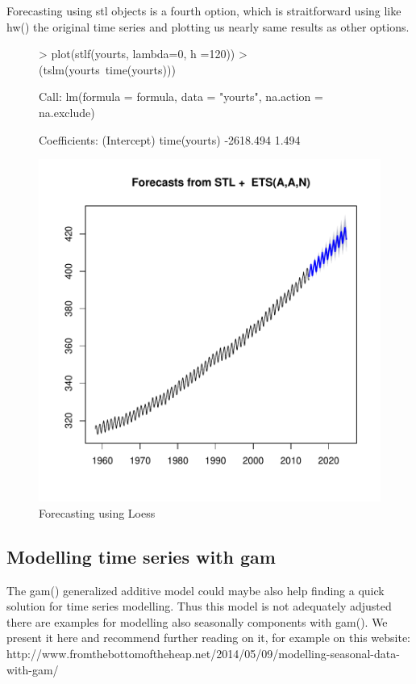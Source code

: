 \documentclass[10pt, a4paper]{article} %
\begin{document}
Forecasting using stl objects is a fourth option, which is straitforward using like hw() the original time series and plotting us nearly same results as other options.
\begin{figure}[H]
\centering
\begin{Schunk}
\begin{Sinput}
> plot(stlf(yourts, lambda=0, h =120))
> (tslm(yourts~time(yourts)))
\end{Sinput}
\begin{Soutput}
Call:
lm(formula = formula, data = "yourts", na.action = na.exclude)

Coefficients:
 (Intercept)  time(yourts)  
   -2618.494         1.494  
\end{Soutput}
\end{Schunk}
\includegraphics{FINAL_VERSION-076}
\caption{Forecasting using Loess}
\end{figure}


\subsection{Modelling time series with gam}

The gam() generalized additive model could maybe also help finding a quick solution for time series modelling. Thus this model is not adequately adjusted there are examples for modelling also seasonally components with gam(). We present it here and recommend further reading on it, for example on this website: http://www.fromthebottomoftheheap.net/2014/05/09/modelling-seasonal-data-with-gam/
\end{document}

